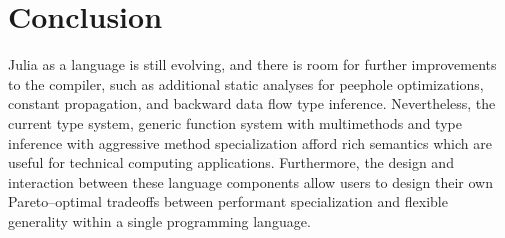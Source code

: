 \documentclass[pldi]{sigplanconf-pldi15}
\begin{document}





\section{Conclusion}

Julia as a language is still evolving, and there is room for further
improvements to the compiler, such as additional static analyses for peephole
optimizations, constant propagation, and backward data flow type inference.
Nevertheless, the current type system, generic function system with
multimethods and type inference with aggressive method specialization afford
rich semantics which are useful for technical computing applications.
Furthermore, the design and interaction between these language components allow
users to design their own Pareto--optimal tradeoffs between performant
specialization and flexible generality within a single programming language.
\end{document}
